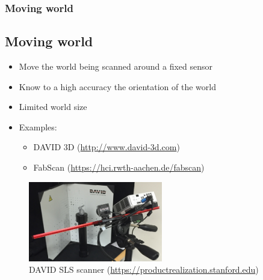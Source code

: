 \documentclass[10pt,serif,t]{beamer}
\newenvironment{SubSlide}[1]
{
  \begin{frame}[fragile,environment=SubSlide]
    \frametitle{#1}
    \subsection{#1}
  }
  {
  \end{frame}
}
\begin{document}
\begin{SubSlide}{Moving world}
  \begin{itemize}
    \item
      Move the world being scanned around a fixed sensor

    \item
      Know to a high accuracy the orientation of the world

    \item
      Limited world size

      \vspace{1em}

      \pause

    \item
      Examples:

      \begin{itemize}
        \item
          DAVID 3D (\url{http://www.david-3d.com})

        \item
          FabScan (\url{https://hci.rwth-aachen.de/fabscan})

      \end{itemize}

  \end{itemize}

  \begin{figure}
    \centering
    \includegraphics[height=3.5cm]{graphics/DAVID_SLS_Scanner.eps}
    \caption{DAVID SLS scanner (\url{https://productrealization.stanford.edu})}
    \label{fig:VisualSFM_Demo}
  \end{figure}
\end{SubSlide}
\end{document}
